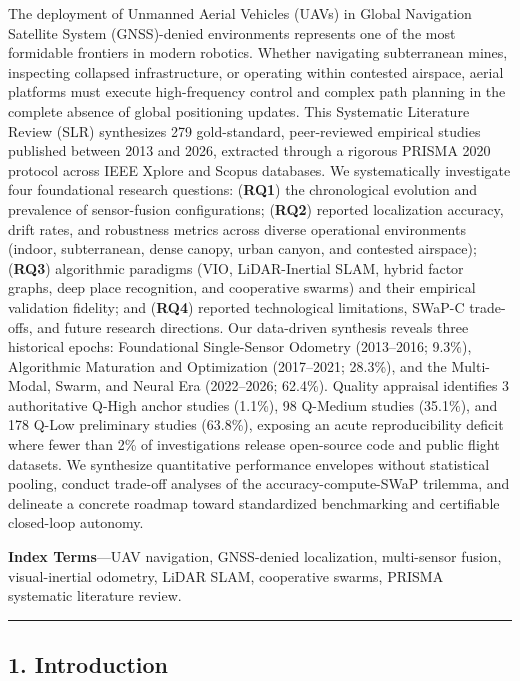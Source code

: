 \documentclass[journal]{IEEEtran}
\begin{document}
The deployment of Unmanned Aerial Vehicles (UAVs) in Global Navigation
Satellite System (GNSS)-denied environments represents one of the most
formidable frontiers in modern robotics. Whether navigating subterranean
mines, inspecting collapsed infrastructure, or operating within
contested airspace, aerial platforms must execute high-frequency control
and complex path planning in the complete absence of global positioning
updates. This Systematic Literature Review (SLR) synthesizes 279
gold-standard, peer-reviewed empirical studies published between 2013
and 2026, extracted through a rigorous PRISMA 2020 protocol across IEEE
Xplore and Scopus databases. We systematically investigate four
foundational research questions: (\textbf{RQ1}) the chronological
evolution and prevalence of sensor-fusion configurations; (\textbf{RQ2})
reported localization accuracy, drift rates, and robustness metrics
across diverse operational environments (indoor, subterranean, dense
canopy, urban canyon, and contested airspace); (\textbf{RQ3})
algorithmic paradigms (VIO, LiDAR-Inertial SLAM, hybrid factor graphs,
deep place recognition, and cooperative swarms) and their empirical
validation fidelity; and (\textbf{RQ4}) reported technological
limitations, SWaP-C trade-offs, and future research directions. Our
data-driven synthesis reveals three historical epochs: Foundational
Single-Sensor Odometry (2013--2016; 9.3\%), Algorithmic Maturation and
Optimization (2017--2021; 28.3\%), and the Multi-Modal, Swarm, and
Neural Era (2022--2026; 62.4\%). Quality appraisal identifies 3
authoritative Q-High anchor studies (1.1\%), 98 Q-Medium studies
(35.1\%), and 178 Q-Low preliminary studies (63.8\%), exposing an acute
reproducibility deficit where fewer than 2\% of investigations release
open-source code and public flight datasets. We synthesize quantitative
performance envelopes without statistical pooling, conduct trade-off
analyses of the accuracy-compute-SWaP trilemma, and delineate a concrete
roadmap toward standardized benchmarking and certifiable closed-loop
autonomy.

\textbf{Index Terms}---UAV navigation, GNSS-denied localization,
multi-sensor fusion, visual-inertial odometry, LiDAR SLAM, cooperative
swarms, PRISMA systematic literature review.

\begin{center}\rule{0.5\linewidth}{0.5pt}\end{center}

\subsection{1. Introduction}\label{introduction}
\end{document}
